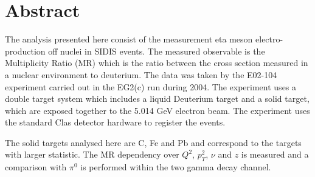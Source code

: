 \chapter*{Abstract}
\pagestyle{fancy}
The analysis presented here consist of the measurement eta meson electro-production off nuclei in SIDIS events. The measured observable is the Multiplicity Ratio (MR) which is the ratio between the cross section measured in a nuclear environment to deuterium. The data was taken by the  E02-104 experiment carried out in the EG2(c) run during 2004. The experiment uses a double target system which includes a liquid Deuterium target and a solid target, which are exposed together to the 5.014 GeV electron beam. The experiment uses the standard Clas detector hardware to register the events.  

The solid targets analysed here are C, Fe and Pb and correspond to the targets with larger statistic. The MR dependency over $Q^2$, $p_T^2$, $\nu$ and $z$ is measured and a comparison with $\pi^0$ is performed within the two gamma decay channel.


